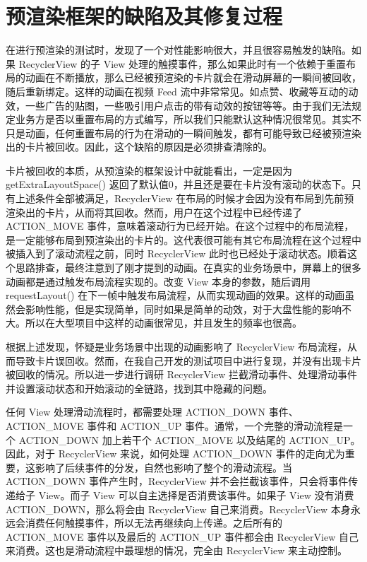 \chapter{预渲染框架的缺陷及其修复过程}

在进行预渲染的测试时，发现了一个对性能影响很大，并且很容易触发的缺陷。如果 RecyclerView 的子 View 处理的触摸事件，那么如果此时有一个依赖于重置布局的动画在不断播放，那么已经被预渲染的卡片就会在滑动屏幕的一瞬间被回收，随后重新绑定。这样的动画在视频 Feed 流中非常常见。如点赞、收藏等互动的动效，一些广告的贴图，一些吸引用户点击的带有动效的按钮等等。由于我们无法规定业务方是否以重置布局的方式编写，所以我们只能默认这种情况很常见。其实不只是动画，任何重置布局的行为在滑动的一瞬间触发，都有可能导致已经被预渲染出的卡片被回收。因此，这个缺陷的原因是必须排查清除的。

卡片被回收的本质，从预渲染的框架设计中就能看出，一定是因为 getExtraLayoutSpace() 返回了默认值0，并且还是要在卡片没有滚动的状态下。只有上述条件全部被满足，RecyclerView 在布局的时候才会因为没有布局到先前预渲染出的卡片，从而将其回收。然而，用户在这个过程中已经传递了 ACTION\_MOVE 事件，意味着滚动行为已经开始。在这个过程中的布局流程，是一定能够布局到预渲染出的卡片的。这代表很可能有其它布局流程在这个过程中被插入到了滚动流程之前，同时 RecyclerView 此时也已经处于滚动状态。顺着这个思路排查，最终注意到了刚才提到的动画。在真实的业务场景中，屏幕上的很多动画都是通过触发布局流程实现的。改变 View 本身的参数，随后调用 requestLayout() 在下一帧中触发布局流程，从而实现动画的效果。这样的动画虽然会影响性能，但是实现简单，同时如果是简单的动效，对于大盘性能的影响不大。所以在大型项目中这样的动画很常见，并且发生的频率也很高。

根据上述发现，怀疑是业务场景中出现的动画影响了 RecyclerView 布局流程，从而导致卡片误回收。然而，在我自己开发的测试项目中进行复现，并没有出现卡片被回收的情况。所以进一步进行调研 RecyclerView 拦截滑动事件、处理滑动事件并设置滚动状态和开始滚动的全链路，找到其中隐藏的问题。

任何 View 处理滑动流程时，都需要处理 ACTION\_DOWN 事件、ACTION\_MOVE 事件和 ACTION\_UP 事件。通常，一个完整的滑动流程是一个 ACTION\_DOWN 加上若干个 ACTION\_MOVE 以及结尾的 ACTION\_UP。因此，对于 RecyclerView 来说，如何处理 ACTION\_DOWN 事件的走向尤为重要，这影响了后续事件的分发，自然也影响了整个的滑动流程。当 ACTION\_DOWN 事件产生时，RecyclerView 并不会拦截该事件，只会将事件传递给子 View。而子 View 可以自主选择是否消费该事件。如果子 View 没有消费 ACTION\_DOWN，那么将会由 RecyclerView 自己来消费。RecyclerView 本身永远会消费任何触摸事件，所以无法再继续向上传递。之后所有的 ACTION\_MOVE 事件以及最后的 ACTION\_UP 事件都会由 RecyclerView 自己来消费。这也是滑动流程中最理想的情况，完全由 RecyclerView 来主动控制。

